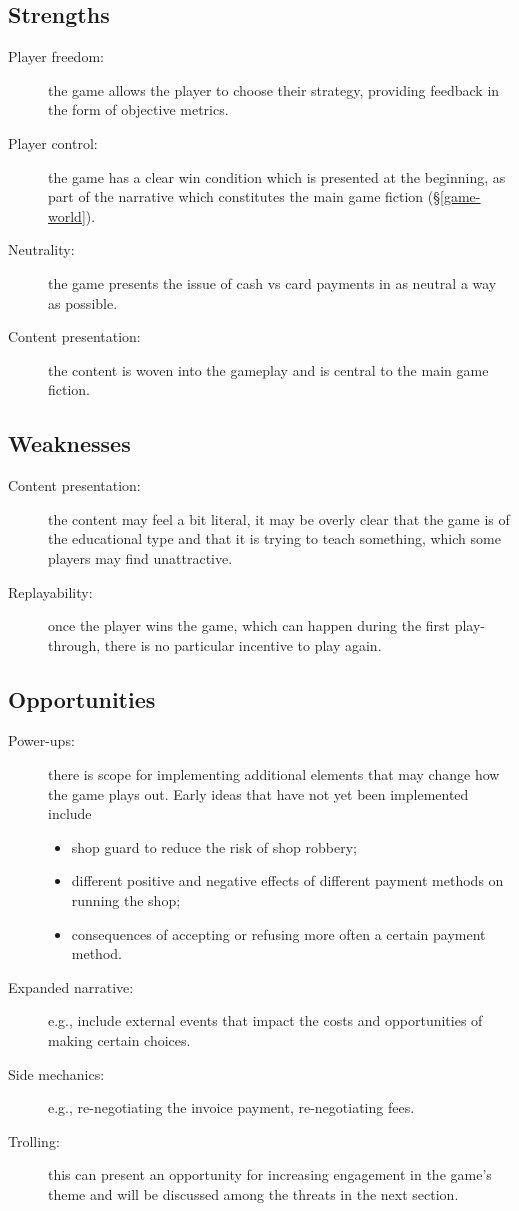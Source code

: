\documentclass[a4paper,11pt]{article}
\begin{document}
\subsection{Strengths}
\begin{description}
  \item[Player freedom:] the game allows the player to choose their strategy, providing feedback in the form of objective metrics.
  \item[Player control:] the game has a clear win condition which is presented at the beginning, as part of the narrative which constitutes the main game fiction (\S\ref{game-world}).
  \item[Neutrality:] the game presents the issue of cash vs card payments in as neutral a way as possible.
  \item[Content presentation:] the content is woven into the gameplay and is central to the main game fiction.
\end{description}

\subsection{Weaknesses}
\begin{description}
  \item[Content presentation:] the content may feel a bit literal, it may be overly clear that the game is of the educational type and that it is trying to teach something, which some players may find unattractive.
  \item[Replayability:] once the player wins the game, which can happen during the first play-through, there is no particular incentive to play again.
\end{description}

\subsection{Opportunities}
\begin{description}
  \item[Power-ups:] there is scope for implementing additional elements that may change how the game plays out. Early ideas that have not yet been implemented include
  \begin{itemize}
    \item shop guard to reduce the risk of shop robbery;
    \item different positive and negative effects of different payment methods on running the shop;
    \item consequences of accepting or refusing more often a certain payment method.
  \end{itemize}
  \item[Expanded narrative:] e.g., include external events that impact the costs and opportunities of making certain choices.
  \item[Side mechanics:] e.g., re-negotiating the invoice payment, re-negotiating fees.
  \item[Trolling:] this can present an opportunity for increasing engagement in the game's theme and will be discussed among the threats in the next section.
\end{description}
\end{document}
